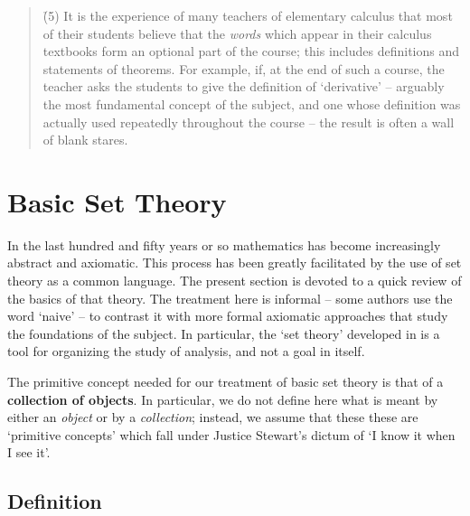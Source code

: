 \begin{quotation}
{\V


    \h  (5) It is the experience of many teachers of elementary calculus that most of their students believe that
    the {\em words} which appear in their calculus textbooks form an optional part of the course; this includes definitions and statements of theorems.
    For example, if, at the end of such a course, the teacher asks the students to give the definition of `derivative'
    -- arguably the most fundamental concept of the subject, and one whose definition was actually used repeatedly throughout the course  --
    the result is often a wall of blank stares.
}%
\end{quotation} 



                        \section{Basic Set Theory}
                        \label{SectA10}


        In the last hundred and fifty years or so mathematics has become increasingly abstract and axiomatic.
    This process has been greatly facilitated by the use of set theory as a common language.
    The present section is devoted to a quick review of the basics of that theory. The treatment here is informal --
    some authors use the word `naive' -- to contrast it with more formal axiomatic approaches that study the foundations of the subject.
    In particular, the `set theory' developed in {\TheseNotes} is a tool for organizing the study of analysis, and not a goal in itself.

\VV


        The primitive concept needed for our treatment of basic set theory is that of a {\bf collection of objects}.
    In particular, we do not define here what is meant by either an {\em object} or by a {\em collection};
    instead, we assume that these these are `primitive concepts' which fall under Justice Stewart's dictum of `I know it when I see it'.

\V

            \subsection{\small{\bf Definition}}
            \label{DefA10.05}

\V

